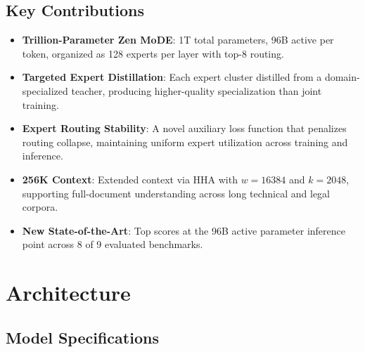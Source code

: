 \documentclass[11pt,a4paper]{article}
\begin{document}
\subsection{Key Contributions}

\begin{itemize}
    \item \textbf{Trillion-Parameter Zen MoDE}: 1T total parameters, 96B active per token,
    organized as 128 experts per layer with top-8 routing.
    \item \textbf{Targeted Expert Distillation}: Each expert cluster distilled from a
    domain-specialized teacher, producing higher-quality specialization than joint training.
    \item \textbf{Expert Routing Stability}: A novel auxiliary loss function that penalizes
    routing collapse, maintaining uniform expert utilization across training and inference.
    \item \textbf{256K Context}: Extended context via HHA with $w = 16384$ and $k = 2048$,
    supporting full-document understanding across long technical and legal corpora.
    \item \textbf{New State-of-the-Art}: Top scores at the 96B active parameter inference
    point across 8 of 9 evaluated benchmarks.
\end{itemize}

\section{Architecture}

\subsection{Model Specifications}
\end{document}
